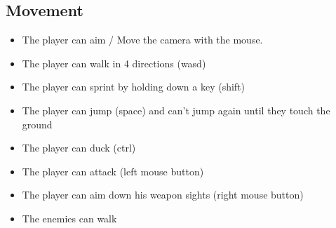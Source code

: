 \documentclass{article}
\begin{document}
\subsection{Movement}
\begin{itemize}
\item The player can aim / Move the camera with the mouse. 
\item The player can walk in 4 directions (wasd)
\item The player can sprint by holding down a key (shift)
\item The player can jump (space) and can't jump again until they touch the ground
\item The player can duck (ctrl)
\item The player can attack (left mouse button)
\item The player can aim down his weapon sights (right mouse button)
\item The enemies can walk
\end{itemize}
\end{document}
